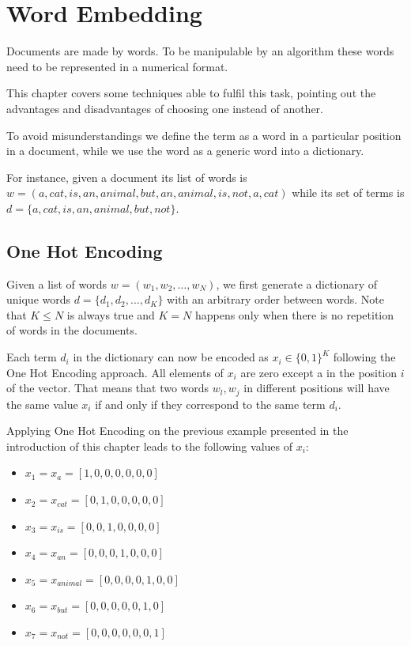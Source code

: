 \chapter{Word Embedding} \label{wordemb}
Documents are made by words.
To be manipulable by an algorithm these words need to be represented in a numerical format.

This chapter covers some techniques able to fulfil this task,
pointing out the advantages and disadvantages of choosing one instead of another.

To avoid misunderstandings
we define the term  as a word in a particular position in a document,
while we use the word  as a generic word into a dictionary.

For instance, given a document  its list of words
is $ w = (a, cat, is, an, animal, but, an, animal, is, not, a, cat)$
while its set of terms is $d = \{a, cat, is, an, animal, but, not\}$.

\section{One Hot Encoding}
Given a list of words $w = (w_1, w_2, \dots, w_N)$,
we first generate a dictionary of unique words
$d = \{d_1, d_2, ..., d_K\}$ with an arbitrary order between words.
Note that $ K \leq N $ is always true and $ K = N $ happens only when there is no repetition of words in the documents.

Each term $d_i$ in the dictionary can now be encoded as $x_i \in \{0,1\}^K$ following the One Hot Encoding approach.
All elements of $x_i$ are zero except a  in the position  $i$ of the vector.
That means that two words $w_l, w_j$ in different positions will have the same value $x_i$ if and only if they correspond to the same term $d_i$.

Applying One Hot Encoding on the previous example presented in the introduction of this chapter leads to the following values of $x_i$:
\begin{multicols}{2}
    \begin{itemize}
        \item $x_1 = x_{a} = [1, 0, 0, 0, 0, 0, 0]$
        \item $x_2 = x_{cat} = [0, 1, 0, 0, 0, 0, 0]$
        \item $x_3 = x_{is} = [0, 0, 1, 0, 0, 0, 0]$
        \item $x_4 = x_{an} = [0, 0, 0, 1, 0, 0, 0]$
        \item $x_5 = x_{animal} = [0, 0, 0, 0, 1, 0, 0]$
        \item $x_6 = x_{but} = [0, 0, 0, 0, 0, 1, 0]$
        \item $x_7 = x_{not} = [0, 0, 0, 0, 0, 0, 1]$
    \end{itemize}
\end{multicols}

